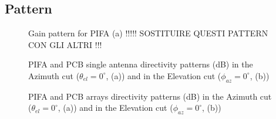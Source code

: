 \documentclass[10pt,a4paper,twocolumn]{article}
\begin{document}
{\clearpage


\subsection*{Pattern}


\begin{figure}[b!]
	\centering
			\begin{subfigure}{0.45\linewidth}
		\def\svgwidth{\linewidth}
	\tiny{}
		\caption{}
	\end{subfigure}
	\begin{subfigure}{0.45\linewidth}
	\def\svgwidth{\linewidth}
	\tiny{}
	\caption{}
\end{subfigure}
	\begin{subfigure}{0.45\linewidth}
	\def\svgwidth{\linewidth}
	\tiny{}
	\caption{}
\end{subfigure}
	\begin{subfigure}{0.45\linewidth}
	\def\svgwidth{\linewidth}
	\tiny{}
	\caption{}
\end{subfigure}

	\caption{Gain pattern for PIFA (a) !!!!! SOSTITUIRE QUESTI PATTERN CON GLI ALTRI !!!}
\end{figure}

\begin{figure}[b!]
		\begin{subfigure}{0.45\linewidth}
				\def\svgwidth{\linewidth}
			\tiny{}
			\caption{}
		\end{subfigure}
	\hfill
		\begin{subfigure}{0.45\linewidth}
				\def\svgwidth{\linewidth}
			\tiny{}
			\caption{}	\end{subfigure}	\hfill
		\caption{
			PIFA and PCB single antenna directivity patterns (dB) in the Azimuth cut  ($\theta_{el}=0^\circ$, (a)) and in the Elevation cut ($\phi_{az}=0^\circ$, (b))}

\end{figure}

\begin{figure}[b!]
	\begin{subfigure}{0.45\linewidth}
		\def\svgwidth{\linewidth}
		\tiny{}
		\caption{}
	\end{subfigure}
	\hfill
	\begin{subfigure}{0.45\linewidth}
		\def\svgwidth{\linewidth}
		\tiny{}
		\caption{}	\end{subfigure}
	\caption{PIFA and PCB arrays directivity patterns (dB) in the Azimuth cut  ($\theta_{el}=0^\circ$, (a)) and in the Elevation cut ($\phi_{az}=0^\circ$, (b))}
\end{figure}


}
\end{document}
